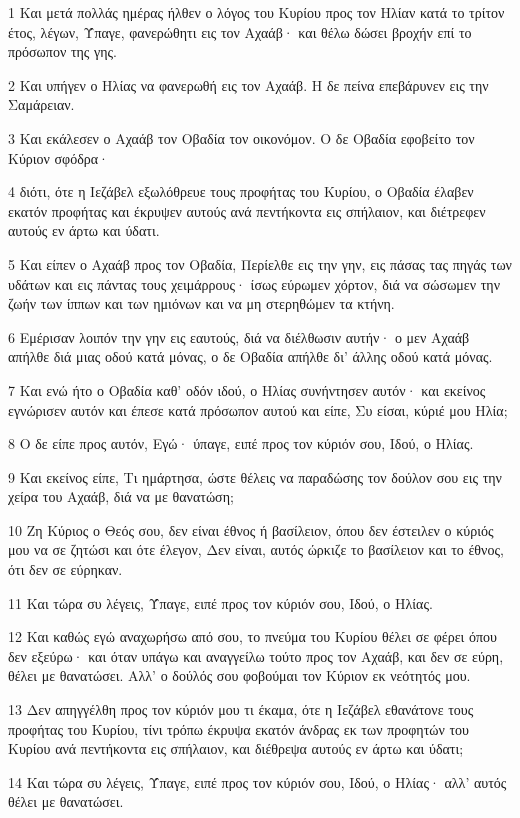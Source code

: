 \par 1 Και μετά πολλάς ημέρας ήλθεν ο λόγος του Κυρίου προς τον Ηλίαν κατά το τρίτον έτος, λέγων, Ύπαγε, φανερώθητι εις τον Αχαάβ· και θέλω δώσει βροχήν επί το πρόσωπον της γης.
\par 2 Και υπήγεν ο Ηλίας να φανερωθή εις τον Αχαάβ. Η δε πείνα επεβάρυνεν εις την Σαμάρειαν.
\par 3 Και εκάλεσεν ο Αχαάβ τον Οβαδία τον οικονόμον. Ο δε Οβαδία εφοβείτο τον Κύριον σφόδρα·
\par 4 διότι, ότε η Ιεζάβελ εξωλόθρευε τους προφήτας του Κυρίου, ο Οβαδία έλαβεν εκατόν προφήτας και έκρυψεν αυτούς ανά πεντήκοντα εις σπήλαιον, και διέτρεφεν αυτούς εν άρτω και ύδατι.
\par 5 Και είπεν ο Αχαάβ προς τον Οβαδία, Περίελθε εις την γην, εις πάσας τας πηγάς των υδάτων και εις πάντας τους χειμάρρους· ίσως εύρωμεν χόρτον, διά να σώσωμεν την ζωήν των ίππων και των ημιόνων και να μη στερηθώμεν τα κτήνη.
\par 6 Εμέρισαν λοιπόν την γην εις εαυτούς, διά να διέλθωσιν αυτήν· ο μεν Αχαάβ απήλθε διά μιας οδού κατά μόνας, ο δε Οβαδία απήλθε δι' άλλης οδού κατά μόνας.
\par 7 Και ενώ ήτο ο Οβαδία καθ' οδόν ιδού, ο Ηλίας συνήντησεν αυτόν· και εκείνος εγνώρισεν αυτόν και έπεσε κατά πρόσωπον αυτού και είπε, Συ είσαι, κύριέ μου Ηλία;
\par 8 Ο δε είπε προς αυτόν, Εγώ· ύπαγε, ειπέ προς τον κύριόν σου, Ιδού, ο Ηλίας.
\par 9 Και εκείνος είπε, Τι ημάρτησα, ώστε θέλεις να παραδώσης τον δούλον σου εις την χείρα του Αχαάβ, διά να με θανατώση;
\par 10 Ζη Κύριος ο Θεός σου, δεν είναι έθνος ή βασίλειον, όπου δεν έστειλεν ο κύριός μου να σε ζητώσι και ότε έλεγον, Δεν είναι, αυτός ώρκιζε το βασίλειον και το έθνος, ότι δεν σε εύρηκαν.
\par 11 Και τώρα συ λέγεις, Ύπαγε, ειπέ προς τον κύριόν σου, Ιδού, ο Ηλίας.
\par 12 Και καθώς εγώ αναχωρήσω από σου, το πνεύμα του Κυρίου θέλει σε φέρει όπου δεν εξεύρω· και όταν υπάγω και αναγγείλω τούτο προς τον Αχαάβ, και δεν σε εύρη, θέλει με θανατώσει. Αλλ' ο δούλός σου φοβούμαι τον Κύριον εκ νεότητός μου.
\par 13 Δεν απηγγέλθη προς τον κύριόν μου τι έκαμα, ότε η Ιεζάβελ εθανάτονε τους προφήτας του Κυρίου, τίνι τρόπω έκρυψα εκατόν άνδρας εκ των προφητών του Κυρίου ανά πεντήκοντα εις σπήλαιον, και διέθρεψα αυτούς εν άρτω και ύδατι;
\par 14 Και τώρα συ λέγεις, Ύπαγε, ειπέ προς τον κύριόν σου, Ιδού, ο Ηλίας· αλλ' αυτός θέλει με θανατώσει.
